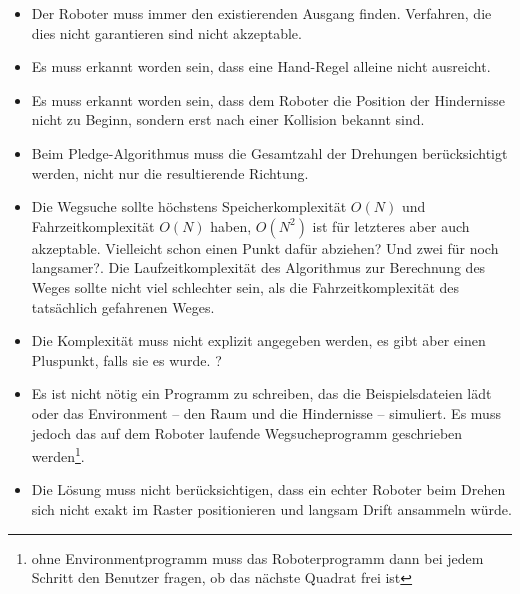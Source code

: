 \documentclass[10pt,a4paper]{article}
\newcommand{\notsure}[1]{{\color{red} #1}}
\begin{document}
\begin{itemize}

\item Der Roboter muss immer den existierenden Ausgang finden. Verfahren, die dies nicht garantieren  sind nicht akzeptable.

\item Es muss erkannt worden sein, dass eine Hand-Regel alleine nicht ausreicht.

\item Es muss erkannt worden sein, dass dem Roboter die Position der Hindernisse nicht zu Beginn, sondern erst nach einer Kollision bekannt sind.

\item Beim Pledge-Algorithmus muss die Gesamtzahl der Drehungen berücksichtigt werden, nicht nur die resultierende Richtung.

\item Die Wegsuche sollte höchstens Speicherkomplexität $O(N)$ und  Fahrzeitkomplexität $O(N)$ haben, $O(N^2)$ ist für letzteres aber auch akzeptable. \notsure{Vielleicht schon einen Punkt dafür abziehen? Und zwei für noch langsamer?}. Die Laufzeitkomplexität des Algorithmus zur Berechnung des Weges  sollte nicht viel schlechter sein, als die Fahrzeitkomplexität des tatsächlich gefahrenen Weges.

\item Die Komplexität muss nicht explizit angegeben werden, es gibt aber einen Pluspunkt, falls sie es wurde. \notsure{?}

\item Es ist nicht nötig ein Programm zu schreiben, das die Beispielsdateien lädt oder das Environment -- den Raum und die Hindernisse -- simuliert. Es muss jedoch das auf dem Roboter laufende Wegsucheprogramm geschrieben werden\footnote{ohne Environmentprogramm muss das Roboterprogramm dann bei jedem Schritt den Benutzer fragen, ob das nächste Quadrat frei ist}. %


\item Die Lösung muss nicht berücksichtigen, dass ein echter Roboter beim Drehen sich nicht exakt im Raster positionieren und langsam Drift ansammeln würde.

\end{itemize}
\end{document}

